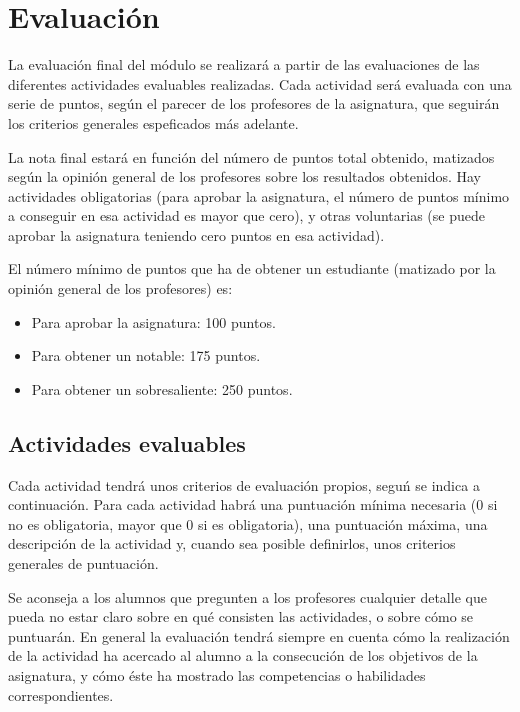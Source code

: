 \documentclass[a4paper,12pt]{article}
\begin{document}
\section{Evaluación}

La evaluación final del módulo se realizará a partir de las evaluaciones de las diferentes actividades evaluables realizadas. Cada actividad será evaluada con una serie de puntos, según el parecer de los profesores de la asignatura, que seguirán los criterios generales espeficados más adelante.

La nota final estará en función del número de puntos total obtenido, matizados según la opinión general de los profesores sobre los resultados obtenidos. Hay actividades obligatorias (para aprobar la asignatura, el número de puntos mínimo a conseguir en esa actividad es mayor que cero), y otras voluntarias (se puede aprobar la asignatura teniendo cero puntos en esa actividad).

El número mínimo de puntos que ha de obtener un estudiante (matizado por la opinión general de los profesores) es:

\begin{itemize}
\item Para aprobar la asignatura: 100 puntos.
\item Para obtener un notable: 175 puntos.
\item Para obtener un sobresaliente: 250 puntos.
\end{itemize}

\subsection{Actividades evaluables}

Cada actividad tendrá unos criterios de evaluación propios, seguń se indica a continuación. Para cada actividad habrá una puntuación mínima necesaria (0 si no es obligatoria, mayor que 0 si es obligatoria), una puntuación máxima, una descripción de la actividad y, cuando sea posible definirlos, unos criterios generales de puntuación.

Se aconseja a los alumnos que pregunten a los profesores cualquier detalle que pueda no estar claro sobre en qué consisten las actividades, o sobre cómo se puntuarán. En general la evaluación tendrá siempre en cuenta cómo la realización de la actividad ha acercado al alumno a la consecución de los objetivos de la asignatura, y cómo éste ha mostrado las competencias o habilidades correspondientes.
\end{document}
